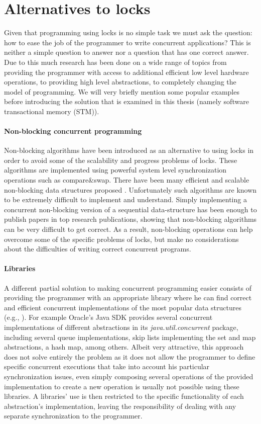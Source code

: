 \section{Alternatives to locks}
Given that programming using locks
is no simple task
we must ask the question:  how to  ease  the  job of  the programmer  to write
concurrent applications?
This is neither a simple question to answer nor a question that has one correct answer.
Due to this much research has been done on a wide range of topics from providing the programmer with access to additional
efficient low level hardware operations, to providing high level abstractions, to completely
changing the model of programming.
We will very briefly mention some popular examples before introducing the solution that is
examined in this thesis (namely software transactional memory (STM)).

\paragraph{Non-blocking concurrent programming}
Non-blocking algorithms \cite{GC96} have been introduced as an alternative to using
locks in order to avoid some of the scalability and progress problems of locks.
These algorithms are implemented using powerful system level synchronization operations such
as compare\&swap.
There have been many efficient and scalable non-blocking data structures proposed
\cite{Mic02,ST04,Val96,FR04,Fra03}.
Unfortunately such algorithms are known to be extremely difficult to implement
and understand.
Simply implementing a concurrent non-blocking version of a sequential data-structure
has been enough to publish papers in top research publications, showing that
non-blocking algorithms can be very difficult to get correct.
As a result, non-blocking operations can help overcome some of the specific problems of locks,
but make no considerations about the difficulties of writing correct concurrent programs.


\paragraph{Libraries}
A different partial  solution to making concurrent programming easier consists of providing 
the programmer with an appropriate 
library where  he  can  find  correct  and  efficient concurrent implementations  of  
the most popular data structures (e.g., \cite{HS08,MS96}). 
For example Oracle's Java SDK \cite{javasdk} provides several concurrent implementations of different abstractions in its
\emph{java.util.concurrent} package, including several queue implementations,
skip lists \cite{Pug90} implementing the set and map abstractions, a hash map, among others.
Albeit very attractive, this approach does not solve entirely the problem  
as it does not allow the programmer to define  specific concurrent executions 
that take into account  his particular  synchronization issues,
even simply composing several operations of the provided implementation
to create a new operation is usually not possible using these libraries.
A libraries' use is then restricted to the specific functionality of each abstraction's implementation,
leaving the responsibility of dealing with any separate synchronization to the programmer.


